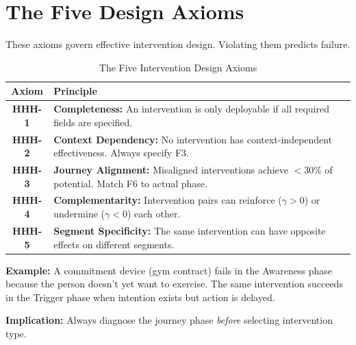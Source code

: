 \documentclass[11pt,a4paper]{article}
\begin{document}
\newpage
\section{The Five Design Axioms}

These axioms govern effective intervention design. Violating them predicts failure.

\begin{table}[h]
\centering
\renewcommand{\arraystretch}{1.5}
\begin{tabular}{@{}cp{10cm}@{}}
\toprule
\textbf{Axiom} & \textbf{Principle} \\
\midrule
\textbf{HHH-1} & \textbf{Completeness:} An intervention is only deployable if all required fields are specified. \\
\textbf{HHH-2} & \textbf{Context Dependency:} No intervention has context-independent effectiveness. Always specify F3. \\
\textbf{HHH-3} & \textbf{Journey Alignment:} Misaligned interventions achieve $<$30\% of potential. Match F6 to actual phase. \\
\textbf{HHH-4} & \textbf{Complementarity:} Intervention pairs can reinforce ($\gamma > 0$) or undermine ($\gamma < 0$) each other. \\
\textbf{HHH-5} & \textbf{Segment Specificity:} The same intervention can have opposite effects on different segments. \\
\bottomrule
\end{tabular}
\caption{The Five Intervention Design Axioms}
\end{table}

\begin{tcolorbox}[colback=primaryblue!5, colframe=primaryblue, title=\textbf{Axiom HHH-3 in Practice}]
\textbf{Example:} A commitment device (gym contract) fails in the Awareness phase because the person doesn't yet want to exercise. The same intervention succeeds in the Trigger phase when intention exists but action is delayed.

\textbf{Implication:} Always diagnose the journey phase \textit{before} selecting intervention type.
\end{tcolorbox}

\end{document}
